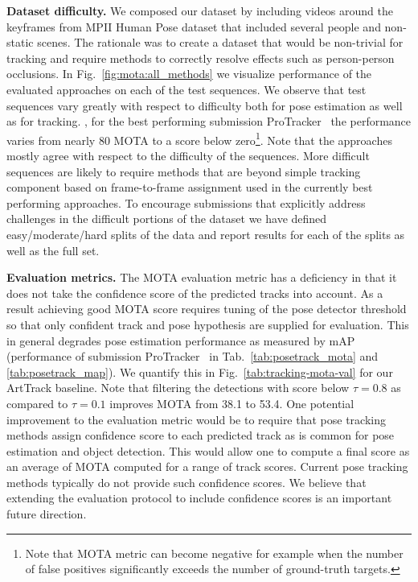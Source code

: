 \documentclass[10pt,twocolumn,letterpaper]{article}
\newcommand{\myparagraph}[1]{\vspace{0.1em}\noindent\textbf{#1}}
\newcommand{\ProTracker}{ProTracker~\cite{ProTracker} \xspace}
\begin{document}
 
\myparagraph{Dataset difficulty.}  We composed our dataset by including videos
around the keyframes from MPII Human Pose dataset that included several people
and non-static scenes. The rationale was to create a dataset that would be
non-trivial for tracking and require methods to correctly resolve effects such
as person-person occlusions. In Fig.~\ref{fig:mota:all_methods} we visualize
performance of the evaluated approaches on each of the test sequences.  We
observe that test sequences vary greatly with respect to difficulty both for
pose estimation as well as for tracking. \Eg, for the best performing submission
\ProTracker the performance varies from nearly 80 MOTA to a score below zero\footnote{Note that MOTA metric can become negative for example when the number
  of false positives significantly exceeds the number of ground-truth
  targets.}. Note that the approaches mostly agree with respect to the
difficulty of the sequences.  More difficult sequences are likely to require
methods that are beyond simple tracking component based on frame-to-frame
assignment used in the currently best performing approaches. To encourage
submissions that explicitly address challenges in the difficult portions of the
dataset we have defined easy/moderate/hard splits of the data and report results
for each of the splits as well as the full set.

 
\myparagraph{Evaluation metrics.} The MOTA evaluation metric has a deficiency in
that it does not take the confidence score of the predicted tracks into
account. As a result achieving good MOTA score requires tuning of the pose
detector threshold so that only confident track and pose hypothesis are supplied
for evaluation. This in general degrades pose estimation performance as measured
by mAP (\cf performance of submission \ProTracker in
Tab.~\ref{tab:posetrack_mota} and \ref{tab:posetrack_map}).  We 
quantify this in Fig.~\ref{tab:tracking-mota-val} for our ArtTrack
baseline. Note that filtering the detections with score below $\tau=0.8$ as
compared to $\tau=0.1$ improves MOTA from 38.1 to 53.4. One potential
improvement to the evaluation metric would be to require that pose tracking
methods assign confidence score to each predicted track as is common for pose
estimation and object detection.  This would allow one to compute a final score as
an average of MOTA computed for a range of track scores. Current pose
tracking methods typically do not provide such confidence scores. We believe that extending
the evaluation protocol to include confidence scores is an important future direction. 
\end{document}
